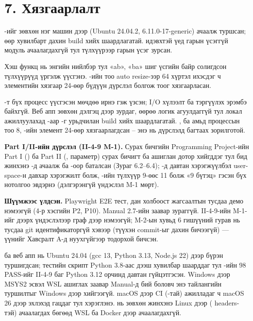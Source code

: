 \section*{7. Хязгаарлалт}

-ийг зөвхөн нэг машин дээр (Ubuntu 24.04.2,  6.11.0-17-generic) ачаалж туршсан; өөр  хувилбарт дахин build хийх шаардлагатай.  идэвхтэй үед гарын үсэггүй модуль ачаалагдахгүй тул  түлхүүрээр гарын үсэг зурсан.

Хэш функц нь энгийн нийлбэр тул «ab», «ba» шиг үсгийн байр солигдсон түлхүүрүүд үргэлж  үүсгэнэ. -ийн тоо auto resize-ээр 64 хүртэл ихэсдэг ч элементийн хязгаар 24-өөр бүдүүн дүрслэл болгож тоог хязгаарласан.

-т бүх процесс үүсгэсэн мөчдөө ирнэ гэж үзсэн; I/O хүлээлт ба тэргүүлэх эрэмбэ байхгүй. Веб апп зөвхөн дэлгэц дээр зурдаг, өөрөө логик агуулдаггүй тул локал ажиллуулахад -аар -г урьдчилан build хийх шаардлагатай. ,  ба амьд процессын тоо 8, -ийн элемент 24-өөр хязгаарлагдсан -- энэ нь дүрслэлд багтаах зорилготой.

\textbf{Part I/II-ийн дүрслэл (II-4-9 M-1).} Сурах бичгийн Programming Project-ийн Part I () ба Part II (,  параметр) сурах бичигт  ба  ашиглан  дотор хийгддэг тул бид жинхэнэ -д ачаалж  ба -оор баталсан (Зураг 6.2--6.4); -д давтан хэрэгжүүлбэл user-space-н давхар хэрэгжилт болж, -ийн түлхүүр 9-өөс 11 болж «9 бүтэц» гэсэн бүх нотолгоо эвдэрнэ (дэлгэрэнгүй үндэслэл M-1 мөрт).

\textbf{Шүүмжээс үлдсэн.} Playwright E2E тест, дан холбоост жагсаалтын тусдаа демо нэмээгүй (4-р хэсгийн P2, P10). Manual 2.7-ийн  заавар зураггүй. II-4-9-ийн M-1-ийг дээрх үндэслэлээр граф дээр нэмээгүй; M-2-ын хувьд 6 гишүүний гурав нь тусдаа git идентификаторгүй хэвээр (түүхэн commit-ыг дахин бичээгүй) --- үүнийг Хавсралт A-д нуухгүйгээр тодорхой бичсэн.


 ба веб апп нь Ubuntu 24.04 (gcc 13, Python 3.13, Node.js 22) дээр бүрэн туршигдсан; тестийн скрипт Python 3.8-аас дээш хувилбар шаарддаг тул -ийн 98 PASS-ийг II-4-9 баг Python 3.12 орчинд давтан гүйцэтгэсэн. Windows дээр MSYS2 эсвэл WSL ашиглах заавар Manual-д бий боловч энэ тайлангийн туршилтыг Windows дээр хийгээгүй. macOS дээр CI (-тай) ажилладаг ч macOS 26 дээр  эхлэхэд гацдаг тул  хэрэглэнэ.  нь зөвхөн жинхэнэ Linux дээр ( headers-тэй) ачаалагдах бөгөөд WSL ба Docker дээр ачаалагдахгүй.

